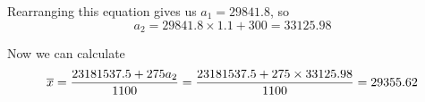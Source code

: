 \documentclass[fleqn]{article}
\begin{document}
\begin{answers}
\begin{enumerate}
		Rearranging this equation gives us \(a_1 = 29841.8\), so
		\[a_2 = 29841.8 \times 1.1 + 300 = 33125.98\]

		Now we can calculate
		\[\overline{x} = \frac{23181537.5 + 275a_2}{1100} = \frac{23181537.5 + 275 \times 33125.98}{1100} = 29355.62\]
	\end{enumerate}


\end{answers}
\end{document}
